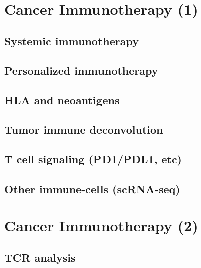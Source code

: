 \documentclass[
]{book}
\begin{document}
\hypertarget{cancerimmuno1}{%
\chapter{Cancer Immunotherapy (1)}\label{cancerimmuno1}}

\hypertarget{systemic-immunotherapy}{%
\section{Systemic immunotherapy}\label{systemic-immunotherapy}}

\hypertarget{personalized-immunotherapy}{%
\section{Personalized immunotherapy}\label{personalized-immunotherapy}}

\hypertarget{hla-and-neoantigens}{%
\section{HLA and neoantigens}\label{hla-and-neoantigens}}

\hypertarget{tumor-immune-deconvolution}{%
\section{Tumor immune deconvolution}\label{tumor-immune-deconvolution}}

\hypertarget{t-cell-signaling-pd1pdl1-etc}{%
\section{T cell signaling (PD1/PDL1, etc)}\label{t-cell-signaling-pd1pdl1-etc}}

\hypertarget{other-immune-cells-scrna-seq}{%
\section{Other immune-cells (scRNA-seq)}\label{other-immune-cells-scrna-seq}}

\hypertarget{cancerimmuno2}{%
\chapter{Cancer Immunotherapy (2)}\label{cancerimmuno2}}

\hypertarget{tcr-analysis}{%
\section{TCR analysis}\label{tcr-analysis}}
\end{document}
